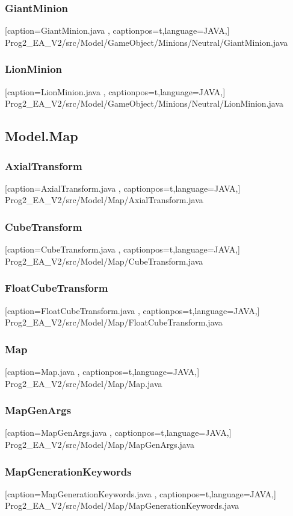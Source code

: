 \documentclass[a4paper,12pt]{scrartcl}
\begin{document}
	\subsubsection{GiantMinion}
	
	[caption={GiantMinion.java}
	\label{lst:javaclass},
	captionpos=t,language=JAVA,]
	{Prog2_EA_V2/src/Model/GameObject/Minions/Neutral/GiantMinion.java}
	\subsubsection{LionMinion}
	
	[caption={LionMinion.java}
	\label{lst:javaclass},
	captionpos=t,language=JAVA,]
	{Prog2_EA_V2/src/Model/GameObject/Minions/Neutral/LionMinion.java}
	\subsection{Model.Map}
	\subsubsection{AxialTransform}
	
	[caption={AxialTransform.java}
	\label{lst:javaclass},
	captionpos=t,language=JAVA,]
	{Prog2_EA_V2/src/Model/Map/AxialTransform.java}
	\subsubsection{CubeTransform}
	
	[caption={CubeTransform.java}
	\label{lst:javaclass},
	captionpos=t,language=JAVA,]
	{Prog2_EA_V2/src/Model/Map/CubeTransform.java}
	\subsubsection{FloatCubeTransform}
	
	[caption={FloatCubeTransform.java}
	\label{lst:javaclass},
	captionpos=t,language=JAVA,]
	{Prog2_EA_V2/src/Model/Map/FloatCubeTransform.java}
	\subsubsection{Map}
	
	[caption={Map.java}
	\label{lst:javaclass},
	captionpos=t,language=JAVA,]
	{Prog2_EA_V2/src/Model/Map/Map.java}
	\subsubsection{MapGenArgs}
	
	[caption={MapGenArgs.java}
	\label{lst:javaclass},
	captionpos=t,language=JAVA,]
	{Prog2_EA_V2/src/Model/Map/MapGenArgs.java}
	\subsubsection{MapGenerationKeywords}
	
	[caption={MapGenerationKeywords.java}
	\label{lst:javaclass},
	captionpos=t,language=JAVA,]
	{Prog2_EA_V2/src/Model/Map/MapGenerationKeywords.java}
\end{document}
